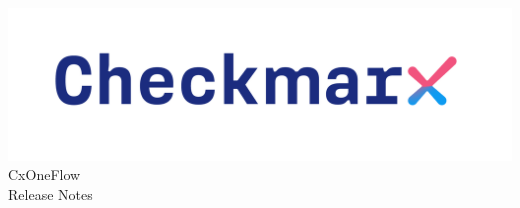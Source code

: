 \documentclass[a4paper, 11pt, oneside]{book}
\begin{document}
\begin{center}
    \includegraphics[scale=.5]{../manual/graphics/cx_logo-dark.png}
    \Huge{CxOneFlow\\Release Notes}
\end{center}


\end{document}
